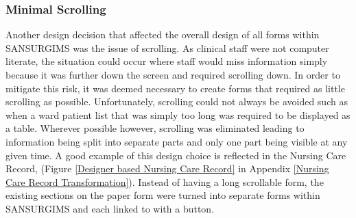 \newpage
\subsubsection{Minimal Scrolling}
Another design decision that affected the overall design of all forms within SANSURGIMS was the issue of scrolling. As clinical staff were not computer literate, the situation could occur where staff would miss information simply because it was further down the screen and required scrolling down. In order to mitigate this risk, it was deemed necessary to create forms that required as little scrolling as possible. Unfortunately, scrolling could not always be avoided such as when a ward patient list that was simply too long was required to be displayed as a table. Wherever possible however, scrolling was eliminated leading to information being split into separate parts and only one part being visible at any given time. A good example of this design choice is reflected in the Nursing Care Record, (Figure \ref{Designer based Nursing Care Record} in Appendix \ref{Nursing Care Record Transformation}). Instead of having a long scrollable form, the existing sections on the paper form were turned into separate forms within SANSURGIMS and each linked to with a button.

